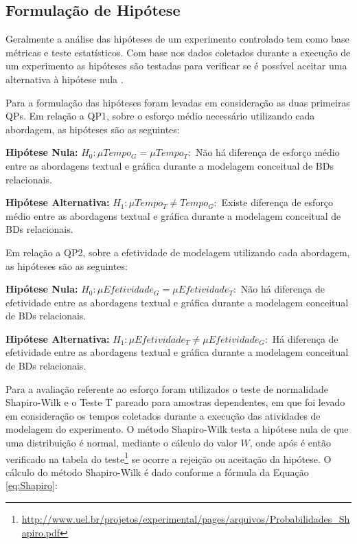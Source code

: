 \subsection{Formulação de Hipótese} \label{ssec:hipExp}

Geralmente a análise das hipóteses de um experimento controlado tem como base métricas e teste estatísticos.
Com base nos dados coletados durante a execução de um experimento as hipóteses são testadas para verificar se é possível aceitar uma alternativa à hipótese nula \cite{Wohlin:2012}.

Para a formulação das hipóteses foram levadas em consideração as duas primeiras \acp{QP}. 
Em relação a \ac{QP}1, sobre o esforço médio necessário utilizando cada abordagem, as hipóteses são as seguintes:

\textbf{Hipótese Nula:} $H_0 : \mu Tempo_G = \mu Tempo_T :$ Não há diferença de esforço médio entre as abordagens textual e gráfica durante a modelagem conceitual de \acp{BD} relacionais. 

\textbf{Hipótese Alternativa:} $H_{1} : \mu Tempo_T \neq Tempo_G :$  Existe diferença de esforço médio entre as abordagens textual e gráfica durante a modelagem conceitual de \acp{BD} relacionais. 

Em relação a \ac{QP}2, sobre a efetividade de modelagem utilizando cada abordagem, as hipóteses são as seguintes:

\textbf{Hipótese Nula:} $H_0 : \mu Efetividade_G = \mu Efetividade_T :$ Não há diferença de efetividade entre as abordagens textual e gráfica durante a modelagem conceitual de \acp{BD} relacionais. 

\textbf{Hipótese Alternativa:} $H_{1} : \mu Efetividade_T \neq \mu Efetividade_G :$ Há diferença de efetividade entre as abordagens textual e gráfica durante a modelagem conceitual de \acp{BD} relacionais. 

Para a avaliação referente ao esforço foram utilizados o teste de normalidade Shapiro-Wilk e o Teste T pareado para amostras dependentes, em que foi levado em consideração os tempos coletados durante a execução das atividades de modelagem do experimento. 
O método Shapiro-Wilk testa a hipótese nula de que uma distribuição é normal, mediante o cálculo do valor $W$, onde após é então verificado na tabela do teste\footnote{\url{http://www.uel.br/projetos/experimental/pages/arquivos/Probabilidades\_Shapiro.pdf}} se ocorre a rejeição ou aceitação da hipótese. 
O cálculo do método Shapiro-Wilk é dado conforme a fórmula da Equação \ref{eq:Shapiro}: 

